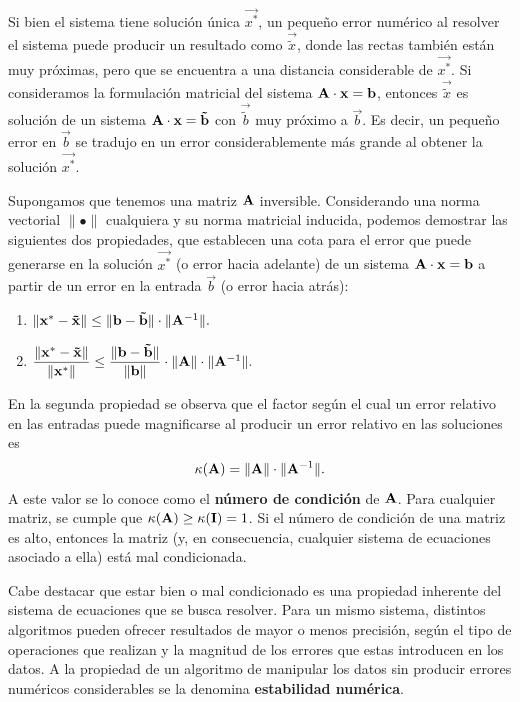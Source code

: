 Si bien el sistema tiene solución única $\vec{x^\ast}$, un pequeño error
numérico al resolver el sistema puede producir un resultado como
$\vec{\tilde x}$, donde las rectas también están muy próximas, pero que
se encuentra a una distancia considerable de $\vec{x^\ast}$.
Si consideramos la formulación matricial del sistema $\mathbf{A} \cdot \mathbf{x} =
\mathbf{b}$, entonces $\vec{\tilde x}$ es solución de un sistema $\mathbf{A} \cdot
\mathbf{x} = \mathbf{\tilde b}$ con $\vec{\tilde b}$ muy próximo a $\vec{b}$.
Es decir, un pequeño error en $\vec{b}$ se tradujo en un error
considerablemente más grande al obtener la solución $\vec{x^\ast}$.

Supongamos que tenemos una matriz $\mathbf{A}$ inversible. Considerando una norma
vectorial $\lVert \bullet \rVert$ cualquiera y su norma matricial inducida,
podemos demostrar las siguientes dos propiedades, que establecen una cota para
el error que puede generarse en la solución $\vec{x^\ast}$ (o error hacia
adelante) de un sistema $\mathbf{A} \cdot \mathbf{x} = \mathbf{b}$ a partir de un error
en la entrada $\vec{b}$ (o error hacia atrás):
\begin{enumerate}[label=(\roman*)]
\item $\lVert \mathbf{x^\ast} - \mathbf{\tilde x} \rVert \leq
    \lVert \mathbf{b} - \mathbf{\tilde b} \rVert \cdot
    \lVert \mathbf{A}^{-1} \rVert.$
\item $\dfrac{\lVert \mathbf{x^\ast} - \mathbf{\tilde x} \rVert}
        {\lVert \mathbf{x^\ast} \rVert} \leq
    \dfrac{\lVert \mathbf{b} - \mathbf{\tilde b} \rVert}
        {\lVert \mathbf{b} \rVert} \cdot
    \lVert \mathbf{A} \rVert \cdot
    \lVert \mathbf{A}^{-1} \rVert.$
\end{enumerate}

En la segunda propiedad se observa que el factor según el cual un error
relativo en las entradas puede magnificarse al producir un error relativo en
las soluciones es
\[ \kappa(\mathbf{A}) = \lVert \mathbf{A} \rVert \cdot \lVert \mathbf{A}^{-1} \rVert.
\]
A este valor se lo conoce como el \textbf{número de condición} de $\mathbf{A}$.
Para cualquier matriz, se cumple que $\kappa(\mathbf{A}) \geq \kappa(\mathbf{I})
= 1$. Si el número de condición de una matriz es alto, entonces la matriz
(y, en consecuencia, cualquier sistema de ecuaciones asociado a ella) está
mal condicionada.

Cabe destacar que estar bien o mal condicionado es una propiedad inherente del
sistema de ecuaciones que se busca resolver. Para un mismo sistema, distintos
algoritmos pueden ofrecer resultados de mayor o menos precisión, según el tipo
de operaciones que realizan y la magnitud de los errores que estas introducen
en los datos. A la propiedad de un algoritmo de manipular los datos sin
producir errores numéricos considerables se la denomina \textbf{estabilidad
numérica}.
